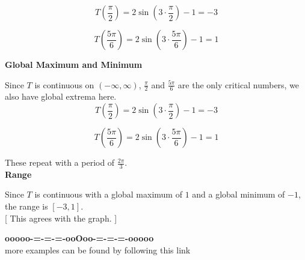 \documentclass{ximera}
\begin{document}
\[
T\left( \frac{\pi}{2} \right) = 2 \sin\left(3 \cdot \frac{\pi}{2} \right) - 1 = -3
\]




\[
T\left( \frac{5\pi}{6} \right) = 2 \sin\left(3 \cdot \frac{5\pi}{6} \right) - 1 = 1
\]












\textbf{\textcolor{blue!55!black}{Global Maximum and Minimum}}


Since $T$ is continuous on $(-\infty, \infty)$, $\frac{\pi}{2}$ and $\frac{5\pi}{6}$ are the only critical numbers, we also have global extrema here. \\




\[
T\left( \frac{\pi}{2} \right) = 2 \sin\left(3 \cdot \frac{\pi}{2} \right) - 1 = -3
\]




\[
T\left( \frac{5\pi}{6} \right) = 2 \sin\left(3 \cdot \frac{5\pi}{6} \right) - 1 = 1
\]




These repeat with a period of $\frac{2\pi}{3}$. \\









\textbf{\textcolor{blue!55!black}{Range}}


Since $T$ is continuous with a global maximum of $1$ and a global minimum of $-1$, the range is $[-3, 1]$.  \\ 



[ This agrees with the graph. ]









































\begin{center}
\textbf{\textcolor{green!50!black}{ooooo-=-=-=-ooOoo-=-=-=-ooooo}} \\

more examples can be found by following this link\\ 

\end{center}
\end{document}
